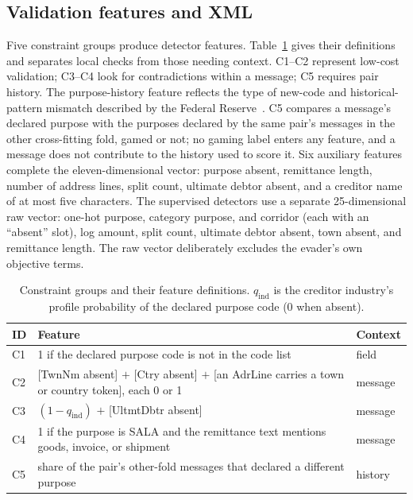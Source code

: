 \documentclass[conference]{IEEEtran}
\begin{document}
\subsection{Validation features and XML}
Five constraint groups produce detector features. Table~\ref{tab:constraints}
gives their definitions and separates local checks from those needing context.
C1--C2 represent low-cost validation; C3--C4 look for contradictions within a
message; C5 requires pair history. The purpose-history feature reflects the
type of new-code and historical-pattern mismatch described by the Federal
Reserve~\cite{frb2026}. C5 compares a message's declared purpose with the
purposes declared by the same pair's messages in the other cross-fitting
fold, gamed or not; no gaming label enters any feature, and a message does not
contribute to the history used to score it. Six auxiliary
features complete the eleven-dimensional vector: purpose absent, remittance
length, number of address lines, split count, ultimate debtor absent, and a
creditor name of at most five characters. The supervised detectors use a
separate 25-dimensional raw vector: one-hot purpose, category purpose, and
corridor (each with an ``absent'' slot), log amount, split count, ultimate
debtor absent, town absent, and remittance length. The raw vector deliberately
excludes the evader's own objective terms.

\begin{table}[!t]
\caption{Constraint groups and their feature definitions. $q_{\mathrm{ind}}$
is the creditor industry's profile probability of the declared purpose code
(0 when absent).}
\label{tab:constraints}
\centering
\scriptsize
\begin{tabularx}{\columnwidth}{@{}lXl@{}}
\toprule
ID & Feature & Context \\
\midrule
C1 & 1 if the declared purpose code is not in the code list & field \\
C2 & [TwnNm absent] $+$ [Ctry absent] $+$ [an AdrLine carries a town or country token], each 0 or 1 & message \\
C3 & $(1-q_{\mathrm{ind}})$ $+$ [UltmtDbtr absent] & message \\
C4 & 1 if the purpose is SALA and the remittance text mentions goods, invoice, or shipment & message \\
C5 & share of the pair's other-fold messages that declared a different purpose & history \\
\bottomrule
\end{tabularx}
\end{table}
\end{document}
